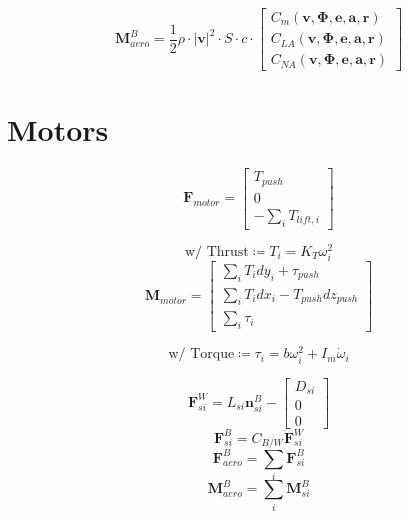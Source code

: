 \documentclass[11pt]{amsart}
\renewcommand{\vec}{\mathbf}
\begin{document}
\begin{equation}
	\vec{M}_{aero}^B = \frac{1}{2}\rho \cdot \left|\vec{v}\right|^2 \cdot S \cdot c \cdot
	\begin{bmatrix}
		C_m(\vec{v}, \vec{\Phi}, \vec{e}, \vec{a}, \vec{r}) \\
		C_{LA}(\vec{v}, \vec{\Phi}, \vec{e}, \vec{a}, \vec{r}) \\
		C_{NA}(\vec{v}, \vec{\Phi}, \vec{e}, \vec{a}, \vec{r})
\end{bmatrix}
\end{equation}

\section{Motors}
\begin{equation}
	\vec{F}_{motor} =
	\begin{bmatrix}
		T_{push} \\
		0 \\
		-\sum_i T_{lift, i}
	\end{bmatrix}
\end{equation}

$$
\text{w/ Thrust} \coloneqq T_i = K_T\omega_i^2
$$
\begin{equation}
	\vec{M}_{motor} =
	\begin{bmatrix}
		\sum_i T_i dy_i + \tau_{push} \\
		\sum_i T_i dx_i - T_{push}dz_{push} \\
		\sum_i \tau_i
	\end{bmatrix}
\end{equation}

$$
\text{w/ Torque} \coloneqq \tau_i = b\omega_i^2 + I_m \dot{\omega}_i
$$

\begin{equation}
	\vec{F}_{si}^W = L_{si}\vec{n}_{si}^B -
	\begin{bmatrix}
		D_{si} \\
		0 \\
		0
	\end{bmatrix}
\end{equation}
$$
\vec{F}_{si}^B = C_{B/W} \vec{F}_{si}^W
$$
$$
\vec{F}_{aero}^B = \sum_i \vec{F}_{si}^B
$$
$$
\vec{M}_{aero}^B = \sum_i \vec{M}_{si}^B
$$
\end{document}

